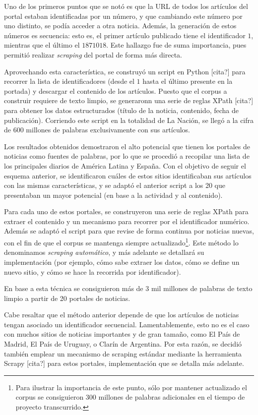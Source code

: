 Uno de los primeros puntos que se notó es que la URL de todos los artículos del portal estaban
identificadas por un número, y que cambiando este número por uno distinto, se podía acceder a otra
noticia. Además, la generación de estos números es secuencia: esto es, el primer artículo publicado
tiene el identificador $1$, mientras que el último el $1871018$. Este hallazgo fue de suma
importancia, pues permitió realizar \textit{scraping} del portal de forma más directa.

Aprovechando esta característica, se construyó un script en Python [cita?] para recorrer la lista de
identificadores (desde el $1$ hasta el último presente en la portada) y descargar el contenido de
los artículos. Puesto que el corpus a construir requiere de texto limpio, se generaronn una serie de
reglas XPath [cita?] para obtener los datos estructurados (título de la noticia, contenido, fecha de
publicación). Corriendo este script en la totalidad de La Nación, se llegó a la cifra de 600
millones de palabras exclusivamente con sus artículos.

Los resultados obtenidos demostraron el alto potencial que tienen los portales de noticias como
fuentes de palabras, por lo que se procedió a recopilar una lista de los principales diarios de
América Latina y España. Con el objetivo de seguir el esquema anterior, se identificaron cuáles de
estos sitios identificaban sus artículos con las mismas características, y se adaptó el anterior
script a los 20 que presentaban un mayor potencial (en base a la actividad y al contenido).

Para cada uno de estos portales, se construyeron una serie de reglas XPath para extraer el contenido
y un mecanismo para recorrer por el identificador numérico. Además se adaptó el script para que
revise de forma continua por noticias nuevas, con el fin de que el corpus se mantenga siempre
actualizado\footnote{Para ilustrar la importancia de este punto, sólo por mantener actualizado el
corpus se consiguieron 300 millones de palabras adicionales en el tiempo de proyecto
transcurrido.}. Este método lo denominamos \textit{scraping automático}, y más adelante se detallará
su implementación (por ejemplo, cómo sabe extraer los datos, cómo se define un nuevo sitio, y cómo se
hace la recorrida por identificador).

En base a esta técnica se consiguieron más de 3 mil millones de palabras de texto limpio a partir de
20 portales de noticias.


Cabe resaltar que el método anterior depende de que los artículos de noticias tengan asociado un
identificador secuencial. Lamentablemente, esto no es el caso con muchos sitios de noticias
importantes y de gran tamaño, como El País de Madrid, El País de Uruguay, o Clarín de Argentina. Por
esta razón, se decidió también emplear un mecanismo de scraping estándar mediante la herramienta
Scrapy [cita?] para estos portales, implementación que se detalla más adelante.


